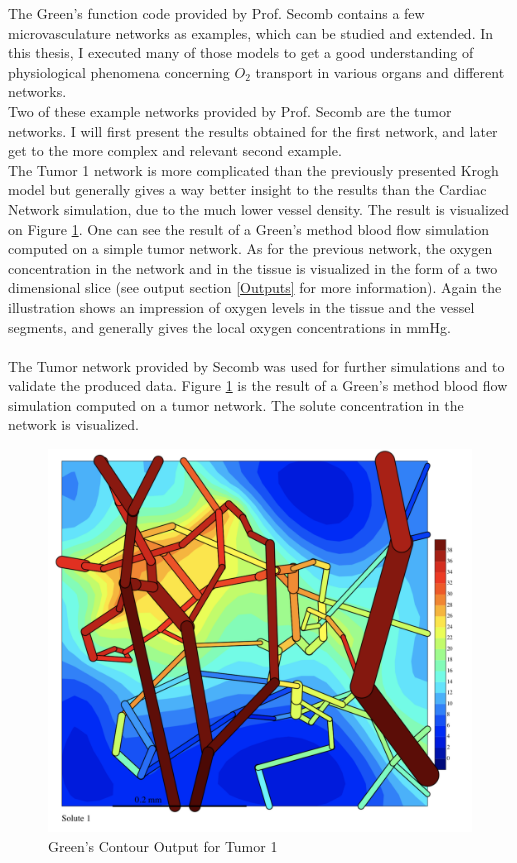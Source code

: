 The Green's function code provided by Prof. Secomb contains a few microvasculature networks as examples, which can be studied and extended. In this thesis, I executed many of those models to get a good understanding of physiological phenomena concerning $O_2$ transport in various organs and different networks.
\\Two of these example networks provided by Prof. Secomb are the tumor networks. I will first present the results obtained for the first network, and later get to the more complex and relevant second example.
\\The Tumor 1 network is more complicated than the previously presented Krogh model but generally gives a way better insight to the results than the Cardiac Network simulation, due to the much lower vessel density. The result is visualized on Figure \ref{fig:Contour_Tumor1998}. One can see the result of a Green's method blood flow simulation computed on a simple tumor network. As for the previous network, the oxygen concentration in the network and in the tissue is visualized in the form of a two dimensional slice (see output section \ref{Outputs} for more information). Again the illustration shows an impression of oxygen levels in the tissue and the vessel segments, and generally gives the local oxygen concentrations in mmHg.\\\\
The Tumor network provided by Secomb was used for further simulations and to validate the produced data.
Figure \ref{fig:Contour_Tumor1998}  is the result of a Green's method blood flow simulation computed on a tumor network. The solute concentration in the network is visualized.\\
\begin{figure}[h]
\centering
\includegraphics[width=120mm]{Contour_Tumor1998}
\caption{\footnotesize Green's Contour Output for Tumor 1}
\label{fig:Contour_Tumor1998}
\end{figure}\\
